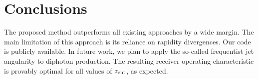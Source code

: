 \section{Conclusions}\label{sec:conclusions}

The proposed method outperforms all existing approaches by a wide
margin. The main limitation of this approach is its reliance on rapidity
divergences. Our code is publicly available. In future work, we plan to
apply the so-called frequentist jet angularity to diphoton production.
The resulting receiver operating characteristic is provably optimal for
all values of $z_{\rm cut}$, as expected.

